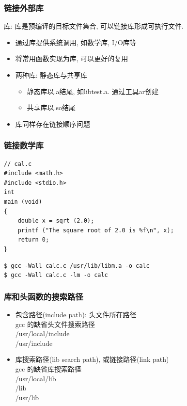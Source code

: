 \documentclass[compress]{beamer}
\begin{document}
\begin{frame}
\frametitle{链接外部库}

库: 库是预编译的目标文件集合, 可以链接库形成可执行文件.
\begin{itemize}
\item 通过库提供系统调用, 如数学库, I/O库等
\item 将常用函数实现为库, 可以更好的复用
\item 两种库: 静态库与共享库
    \begin{itemize}
    \item 静态库以.a结尾, 如libtest.a. 通过工具\alert{ar}创建
    \item 共享库以.so结尾
    \end{itemize}

\item 库同样存在链接顺序问题
\end{itemize}
\end{frame}

\begin{frame}[fragile]
\frametitle{链接数学库}

\begin{lstlisting}
// cal.c
#include <math.h>
#include <stdio.h>
int
main (void)
{
    double x = sqrt (2.0);
    printf ("The square root of 2.0 is %f\n", x);
    return 0;
}
\end{lstlisting}

\begin{verbatim}
$ gcc -Wall calc.c /usr/lib/libm.a -o calc
$ gcc -Wall calc.c -lm -o calc
\end{verbatim}

\end{frame}


\begin{frame}
\frametitle{库和头函数的搜索路径}

\begin{itemize}
\item 包含路径(include path): 头文件所在路径\\
gcc 的缺省头文件搜索路径\\
/usr/local/include\\
/usr/include

\item 库搜索路径(lib search path), 或链接路径(link path)\\
gcc 的缺省库搜索路径\\
/usr/local/lib\\
/lib \\
/usr/lib
\end{itemize}

\end{frame}
\end{document}
